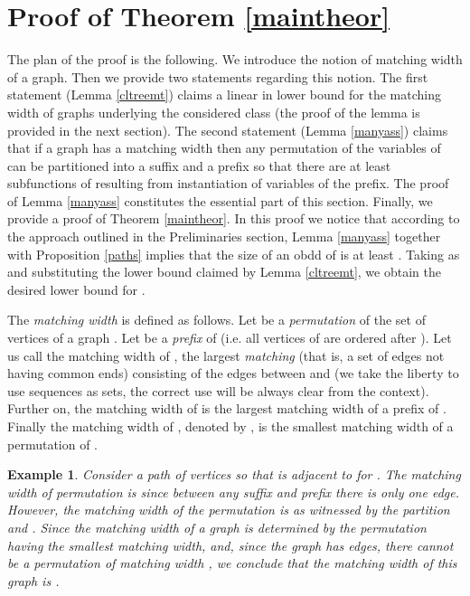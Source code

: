\documentclass{article}
\newtheorem{example}{Example}
\begin{document}
\section{Proof of Theorem \ref{maintheor}} \label{lbaux1}
The plan of the proof is the following. We introduce the notion of
matching width of a graph. Then we provide two statements regarding this
notion. The first statement (Lemma \ref{cltreemt}) claims a linear in  lower bound 
for the matching width of graphs  underlying the considered class
 (the proof of the lemma is provided in the next section).
The second statement (Lemma \ref{manyass}) claims that if a graph  has a matching width 
then any permutation of the variables of  can be partitioned into 
a suffix and a prefix so that there are at least  subfunctions of 
resulting from instantiation of variables of the prefix. The proof of Lemma \ref{manyass}
constitutes the essential part of this section. 
Finally, we provide a proof of Theorem \ref{maintheor}.
In this proof we notice that according to the approach 
outlined in the Preliminaries section, Lemma \ref{manyass} together
with Proposition \ref{paths} implies that the size of an {\sc obdd} of 
is at least . Taking  as  and substituting the lower
bound claimed by Lemma \ref{cltreemt}, we obtain the desired lower bound for
. 

The \emph{matching width} is defined as follows.
Let  be a \emph{permutation} of the set  of vertices of a graph
. 
Let  be a \emph{prefix} of  (i.e. all vertices of  are ordered after
). Let us call the matching width of ,
the largest \emph{matching} (that is, a set of edges not having common ends)
consisting of the edges between  and 
(we take the liberty to use sequences as sets, the correct use will be always clear
from the context). Further on, the matching width of  is the largest matching
width of a prefix of . Finally the matching width of , denoted by , is the smallest 
matching width of a permutation of . 

\begin{example}
Consider a path of  vertices  so that  is adjacent to  for
. The matching width of permutation  is  since between any suffix
and prefix there is only one edge. However, the matching width of the permutation 
 is  as witnessed by the partition
 and . Since the matching width of a graph is determined
by the permutation having the smallest matching width, and, since the graph has edges, there cannot be
a permutation of matching width , we conclude that the matching width of this graph is .
\end{example}
\end{document}
